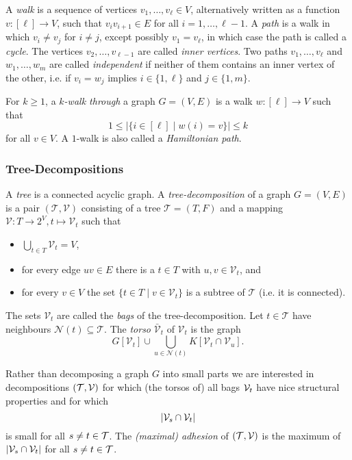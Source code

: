 \documentclass[12pt]{amsart}
\newcommand{\suchthat}{\mathbin |}
\newcommand{\absval}[1]{\left\vert #1 \right\vert}
\newcommand{\cT}{\mathcal{T}}
\newcommand{\cV}{\mathcal{V}}
\newcommand{\cN}{\mathcal{N}}
\begin{document}
A \emph{walk} is a sequence of vertices $v_1,\ldots,v_{\ell} \in V$,
alternatively written as a function $v:[\ell] \to V$, such that
$v_iv_{i+1} \in E$ for all $i=1,\ldots,\ell-1$. A \emph{path} is a
walk in which $v_i \not= v_j$ for $i \not= j$, except possibly $v_1 =
v_{\ell}$, in which case the path is called a \emph{cycle}. The vertices
$v_2,\ldots,v_{\ell-1}$ are called \emph{inner vertices}. Two paths
$v_1,\ldots,v_{\ell}$ and $w_1,\ldots,w_{m}$ are called
\emph{independent} if neither of them contains an inner vertex of the
other, i.e. if $v_i=w_j$ implies $i \in \{1,\ell\}$ and $j \in
\{1,m\}$.

For $k \geq 1$, a \emph{$k$-walk through} a graph $G = (V,E)$ is a
walk $w : [\ell] \to V$ such that 
\[
1 \leq \absval{ \{ i \in [\ell] \suchthat w(i) = v \} } \leq k
\]
for all $v \in V$.
A $1$-walk is also called a \emph{Hamiltonian path}. 





\subsubsection*{Tree-Decompositions}

A \emph{tree} is a connected acyclic graph.
A \emph{tree-decomposition} of a graph $G = (V,E)$ is a pair
$(\cT,\cV)$ consisting of a tree $\cT = (T,F)$ and a mapping $\cV:T\to
2^V, t \mapsto \cV_t$ such that
\begin{itemize}
\item $\bigcup_{t \in T} \cV_t = V$,
\item for every edge $uv \in E$ there is a $t \in T$ with $u,v \in
  \cV_t$, and
\item for every $v \in V$ the set $\{ t \in T \suchthat v \in \cV_t \}$ is a
  subtree of $\cT$ (i.e. it is connected).
\end{itemize}
The sets $\cV_t$ are called the \emph{bags} of the
tree-decomposition. Let $t \in \cT$ have neighbours
$\cN(t) \subseteq \cT$. The \emph{torso} $\bar{\cV}_t$ of
$\cV_t$ is the graph
\[
G[\cV_t] \cup \bigcup_{u \in \cN(t)} K[\cV_t \cap \cV_u].
\]

Rather than decomposing a graph $G$ into small parts we are interested
in decompositions $(\mathcal{T},\mathcal{V})$ for which (the torsos of) all bags
$\mathcal{V}_t$ have nice structural properties and for which
\[
\absval{\VVV_s \cap \VVV_t}
\]
is small for all $s \not = t \in \mathcal{T}$. The \emph{(maximal) adhesion} of
$(\mathcal{T},\mathcal{V})$ is the maximum of $\absval{\VVV_s \cap \VVV_t}$ for all
$s \not= t \in \mathcal{T}$.
\end{document}
